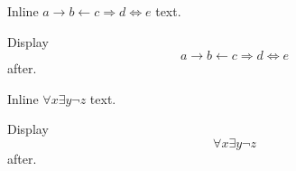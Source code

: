 \documentclass[12pt]{article}
\begin{document}
Inline $a \to b \gets c \Rightarrow d \Leftrightarrow e$ text.

Display \[ a \to b \gets c \Rightarrow d \Leftrightarrow e \] after.

Inline $\forall x \exists y \neg z$ text.

Display \[ \forall x \exists y \neg z \] after.
\end{document}
